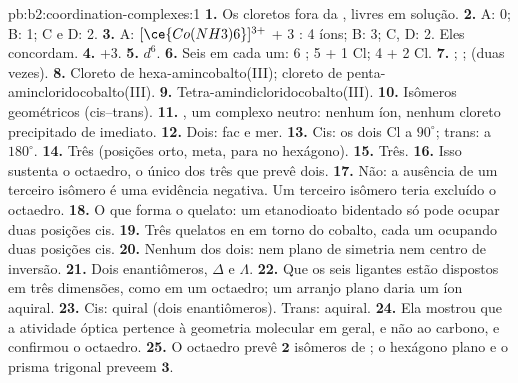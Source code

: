 \begin{solution}{pb:b2:coordination-complexes:1}
\textbf{1.} Os cloretos fora da , livres em solução.
\textbf{2.} A: 0; B: 1; C e D: 2.
\textbf{3.} A: $[\ce{Co(NH3)6}]^{3+}$ + 3 : 4 íons; B: 3; C, D: 2. Eles concordam.
\textbf{4.} +3.
\textbf{5.} $d^6$.
\textbf{6.} Seis em cada um: 6 ; 5  + 1 Cl; 4  + 2 Cl.
\textbf{7.} ; ;  (duas vezes).
\textbf{8.} Cloreto de hexa-amincobalto(III); cloreto de penta-amincloridocobalto(III).
\textbf{9.} Tetra-amindicloridocobalto(III).
\textbf{10.} Isômeros geométricos (cis--trans).
\textbf{11.} \ce{[CoCl3(NH3)3]}, um complexo neutro: nenhum íon, nenhum cloreto
precipitado de imediato.
\textbf{12.} Dois: fac e mer.
\textbf{13.} Cis: os dois Cl a $90^\circ$; trans: a $180^\circ$.
\textbf{14.} Três (posições orto, meta, para no hexágono).
\textbf{15.} Três.
\textbf{16.} Isso sustenta o octaedro, o único dos três que prevê dois.
\textbf{17.} Não: a ausência de um terceiro isômero é uma evidência negativa. Um
terceiro isômero teria excluído o octaedro.
\textbf{18.} O que forma o quelato: um etanodioato bidentado só pode ocupar duas
posições cis.
\textbf{19.} Três quelatos en em torno do cobalto, cada um ocupando duas posições cis.
\textbf{20.} Nenhum dos dois: nem plano de simetria nem centro de inversão.
\textbf{21.} Dois enantiômeros, $\Delta$ e $\Lambda$.
\textbf{22.} Que os seis ligantes estão dispostos em três dimensões, como em um
octaedro; um arranjo plano daria um íon aquiral.
\textbf{23.} Cis: quiral (dois enantiômeros). Trans: aquiral.
\textbf{24.} Ela mostrou que a atividade óptica pertence à geometria molecular em
geral, e não ao carbono, e confirmou o octaedro.
\textbf{25.} O octaedro prevê $\boldsymbol{2}$ isômeros de \ce{[CoCl2(NH3)4]+}; o
hexágono plano e o prisma trigonal preveem $\boldsymbol{3}$.
\end{solution}
